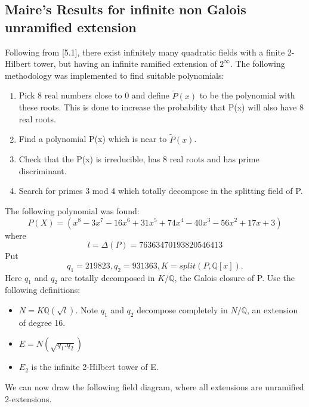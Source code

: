 \documentclass[preprint,12pt,reqno]{elsarticle}
\begin{document}
\subsection{Maire's Results for infinite non Galois unramified extension}
Following from \cite{MAIR}[5.1], there exist infinitely many quadratic fields with a finite 2-Hilbert tower, but having an infinite ramified extension of $2^{\infty{}}$. 
The following methodology was implemented  to find suitable polynomials:
\newline
\begin{enumerate}
    \item Pick 8 real numbers close to 0 and define $\tilde{P}(x)$ to be the polynomial with these roots. This is done to increase the probability that P(x) will also have 8 real roots. 
    \item Find a polynomial P(x) which is near to $\tilde{P}(x)$.
    \item Check that the P(x) is irreducible, has 8 real roots and has prime discriminant. 
    \item Search for primes 3 mod 4 which totally decompose in the splitting field of P. 
\end{enumerate}
The following polynomial was found: 
\begin{equation}
    P(X) = (x^8 - 3x^7 - 16x^6 + 31x^5 + 74x^4 - 40x^3 - 56x^2 + 17x + 3)
\end{equation}
where 
\begin{equation}
    l = \Delta(P) = 76363470193820546413
\end{equation}
Put \begin{equation}
    q_1 = 219823, q_2 = 931363, K = split(P, \mathbb{Q}[x]).
\end{equation}
\newline
Here $q_1$ and  $q_2$ are totally decomposed in $K/\mathbb{Q}$, the Galois closure of P.
\newline
Use the following definitions: 
\begin{itemize}
    \item $N = K\mathbb{Q}(\sqrt{l})$. Note $q_1$ and $q_2$ decompose completely in $N/\mathbb{Q}$, an extension of degree 16.
    \item $E = N(\sqrt{q_1.q_2})$
    \item $E_2$ is the infinite 2-Hilbert tower of E.
\end{itemize}
\newline 
We can now draw the following field diagram, where all extensions are unramified 2-extensions. 
\end{document}
